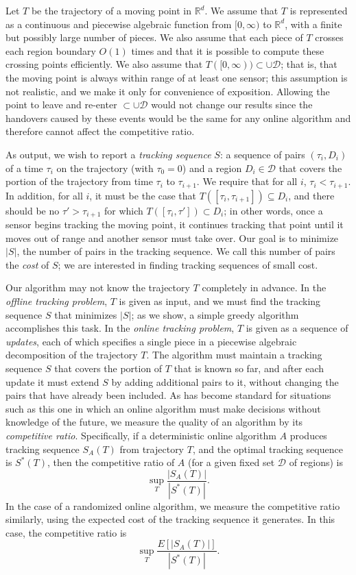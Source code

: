 \documentclass[runningheads]{llncs}
\newcommand {\mathset} [1] {\ensuremath {\mathbb {#1}}}
\newcommand {\R} {\mathset {R}}
\newcommand {\script} [1] {\ensuremath {\mathcal {#1}}}
\begin{document}
Let $T$ be the trajectory of a moving point in $\R^d$. We assume that $T$ is represented as a continuous and piecewise algebraic function from $[0,\infty)$ to $\R^d$, with a finite but possibly large number of pieces. We also assume that each piece of $T$ crosses each region boundary $O(1)$ times and that it is possible to compute these crossing points efficiently. We also assume that $T([0,\infty))\subset\cup\script D$; that is, that the moving point is always within range of at least one sensor; this assumption is not realistic, and we make it only for convenience of exposition. Allowing the point to leave and re-enter $\subset\cup\script D$ would not change our results since the handovers caused by these events would be the same for any online algorithm and therefore cannot affect the competitive ratio.

As output, we wish to report a \emph{tracking sequence} $S$: a sequence of pairs $(\tau_i,D_i)$ of a time $\tau_i$ on the trajectory (with $\tau_0=0$) and a region $D_i\in\script D$ that covers the portion of the trajectory from time $\tau_i$ to $\tau_{i+1}$. We require that for all $i$, $\tau_i<\tau_{i+1}$. In addition, for all $i$, it must be the case that $T([\tau_i,\tau_{i+1}])\subseteq D_i$, and there should be no $\tau'>\tau_{i+1}$ for which $T([\tau_i,\tau'])\subset D_i$; in other words, once a sensor begins tracking the moving point, it continues tracking that point until it moves out of range and another sensor must take over.  Our goal is to minimize $|S|$, the number of pairs in the tracking sequence. We call this number of pairs the \emph{cost} of $S$; we are interested in finding tracking sequences of small cost.

Our algorithm may not know the trajectory $T$ completely in advance. In the \emph{offline tracking problem}, $T$ is given as input, and we must find the tracking sequence $S$ that minimizes $|S|$; as we show, a simple greedy algorithm accomplishes this task. In the \emph{online tracking problem}, $T$ is given as a sequence of \emph{updates}, each of which specifies a single piece in a piecewise algebraic decomposition of the trajectory $T$. The algorithm must maintain a tracking sequence $S$ that covers the portion of $T$ that is known so far, and after each update it must extend $S$ by adding additional pairs to it, without changing the pairs that have already been included. As has become standard for situations such as this one in which an online algorithm must make decisions without knowledge of the future, we measure the quality of an algorithm by its \emph{competitive ratio}. Specifically, if a deterministic online algorithm $A$ produces tracking sequence $S_A(T)$ from trajectory $T$, and the optimal tracking sequence is $S^*(T)$, then the competitive ratio of $A$ (for a given fixed set $\script D$ of regions) is
$$\sup_T\frac{|S_A(T)|}{|S^*(T)|}.$$
In the case of a randomized online algorithm, we measure the competitive ratio similarly, using the expected cost of the tracking sequence it generates. In this case, the competitive ratio is
$$\sup_T\frac{E[|S_A(T)|]}{|S^*(T)|}.$$
\end{document}
